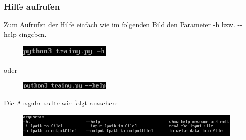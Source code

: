 \documentclass[12pt]{scrartcl}
\begin{document}
\subsubsection{Hilfe aufrufen}
\label{sec:first-steps-help}
Zum Aufrufen der Hilfe einfach wie im folgenden Bild den Parameter -h bzw. -{}-help eingeben.
\newline
\begin{figure}[htbp]
\centering
\includegraphics[width=0.4\textwidth]{ersteSchritteHilfeTrainy1}\par\vspace{0.25cm}
\label{fig:ersteSchritteHilfeTrainy1}
\end{figure}
\begin{center}
oder
\end{center}
\begin{figure}[htbp]
\centering
\includegraphics[width=0.4\textwidth]{ersteSchritteHilfeTrainy2}\par\vspace{0.25cm}
\label{fig:ersteSchritteHilfeTrainy2}
\end{figure}
Die Ausgabe sollte wie folgt aussehen:
\begin{figure}[htbp]
\centering
\includegraphics[width=1.1\textwidth]{ersteSchritteHilfeTrainy3}\par\vspace{0.5cm}
\label{fig:ersteSchritteHilfeTrainy3}
\end{figure}

\newpage


\end{document}
